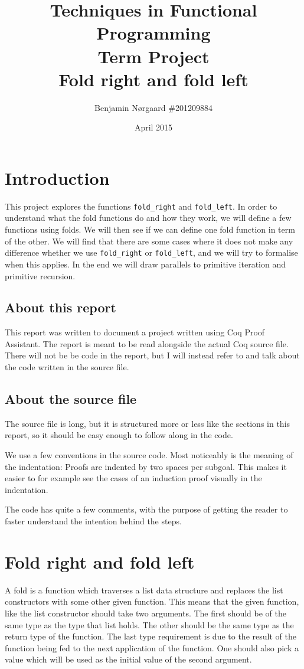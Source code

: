 \documentclass[a4paper]{article}
\title{Techniques in Functional Programming\\
Term Project\\
Fold right and fold left}
\author{Benjamin Nørgaard \#201209884}
\date{April 2015}
\begin{document}
\maketitle
\tableofcontents
\clearpage
\section{Introduction}
This project explores the functions \texttt{fold\_right} and
\texttt{fold\_left}. In order to understand what the fold functions do and how
they work, we will define a few functions using folds. We will then see if we
can define one fold function in term of the other. We will find that there are
some cases where it does not make any difference whether we use
\texttt{fold\_right} or \texttt{fold\_left}, and we will try to formalise when
this applies. In the end we will draw parallels to primitive iteration and
primitive recursion.

\subsection{About this report}
This report was written to document a project written using Coq Proof Assistant.
The report is meant to be read alongside the actual Coq source file. There will
not be be code in the report, but I will instead refer to and talk about the
code written in the source file.

\subsection{About the source file}
The source file is long, but it is structured more or less like the sections in
this report, so it should be easy enough to follow along in the code.

We use a few conventions in the source code. Most noticeably is the meaning of
the indentation: Proofs are indented by two spaces per subgoal. This makes it
easier to for example see the cases of an induction proof visually in the
indentation.

The code has quite a few comments, with the purpose of getting the reader to
faster understand the intention behind the steps.

\section{Fold right and fold left}
A fold is a function which traverses a list data structure and replaces the
list constructors with some other given function. This means that the given
function, like the list constructor should take two arguments. The first should
be of the same type as the type that list holds. The other should be the same
type as the return type of the function.  The last type requirement is due to
the result of the function being fed to the next application of the function.
One should also pick a value which will be used as the initial value of the
second argument.
\end{document}
